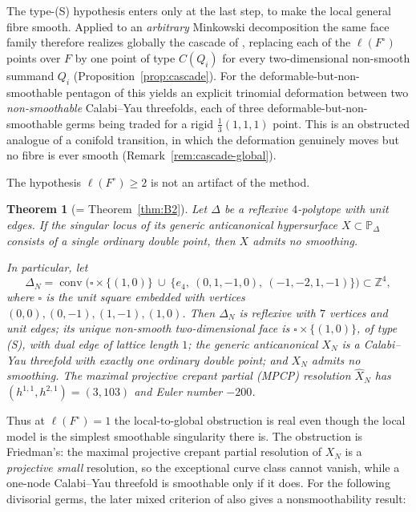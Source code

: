 \documentclass[11pt]{amsart}
\newtheorem{theorem}{Theorem}[section]
\theoremstyle{definition}
\theoremstyle{remark}
\newcommand{\ZZ}{\mathbb{Z}}
\newcommand{\PP}{\mathbb{P}}
\newcommand{\conv}{\operatorname{conv}}
\begin{document}
The type-(S) hypothesis enters only at the last step, to make the local
general fibre smooth.  Applied to an \emph{arbitrary} Minkowski
decomposition the same face family therefore realizes globally the
cascade of \cite[Lemma~2.4]{paper1}, replacing each of the
$\ell(F^\circ)$ points over $F$ by one point of type $C(Q_i)$ for every
two-dimensional non-smooth summand $Q_i$
(Proposition~\ref{prop:cascade}).  For the deformable-but-non-smoothable
pentagon of \cite{paper1} this yields an explicit trinomial deformation
between two \emph{non-smoothable} Calabi--Yau threefolds, each of
three deformable-but-non-smoothable germs being traded for a rigid
$\tfrac13(1,1,1)$ point.  This is an obstructed analogue of a conifold
transition, in which the deformation genuinely moves but no fibre is ever
smooth (Remark~\ref{rem:cascade-global}).

The hypothesis $\ell(F^\circ)\ge 2$ is not an artifact of the method.

\begin{theorem}[= Theorem~\ref{thm:B2}]\label{thm:B}
Let $\Delta$ be a reflexive $4$-polytope with unit edges.  If the singular
locus of its generic anticanonical hypersurface $X\subset\PP_\Delta$
consists of a single ordinary double point, then $X$ admits no smoothing.

In particular, let
\[
\Delta_N=\conv\bigl(\square\times\{(1,0)\}\ \cup\ \{e_4,\ (0,1,-1,0),\
(-1,-2,1,-1)\}\bigr)\subset\ZZ^4,
\]
where $\square$ is the unit square embedded with vertices
$(0,0),(0,-1),(1,-1),(1,0)$.  Then $\Delta_N$ is reflexive with $7$
vertices and unit edges; its unique non-smooth two-dimensional face is
$\square\times\{(1,0)\}$, of type \textup{(S)}, with dual edge of lattice
length $1$; the generic anticanonical $X_N$ is a Calabi--Yau threefold
with exactly one ordinary double point; and $X_N$ admits no smoothing.
The maximal projective crepant partial (MPCP) resolution $\widehat X_N$ has
$(h^{1,1}, h^{2,1}) = (3, 103)$ and Euler number $-200$.
\end{theorem}

Thus at $\ell(F^\circ)=1$ the local-to-global obstruction is real even
though the local
model is the simplest smoothable singularity there is.  The obstruction
is Friedman's: the maximal projective crepant partial resolution of $X_N$
is a \emph{projective small} resolution, so the exceptional curve class
cannot vanish, while a one-node Calabi--Yau threefold is smoothable only
if it does.  For the following divisorial germs, the later mixed
criterion of \cite{paper5} also gives a nonsmoothability result:
\end{document}
